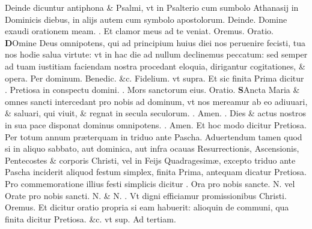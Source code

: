 \documentclass[a5paper,10pt]{book}
\makeatletter
\DeclareRobustCommand{\Vbar}{\vers@resp{-0.1em}{V}}
\DeclareRobustCommand{\Rbar}{\vers@resp{0pt}{R}}
\newcommand{\vers@resp@sym}{\raisebox{0.2ex}{\rotatebox[origin=c]{-20}{$\m@th\rceil$}}}
\newcommand{\vers@resp}[2]{%
  {\ooalign{\hidewidth\kern#1\vers@resp@sym\hidewidth\cr#2\cr}}%
}%
\def\ae{æ}
\makeatother
\begin{document}
\begin{multicols*}{2}
\newline {} \color{red} Deinde dicuntur %
antiphona \& Psalmi, vt in Psalterio cum sumbolo Athanasij in Dominicis diebus, in alijs autem cum symbolo apostolorum. Deinde. \color{black} Domine exaudi orationem meam. \color{red} \Rbar . \color{black} Et clamor meus ad te veniat. \color{red} O\color{black}remus. \color{red} Oratio. \color{black}
\vspace{-.25em}
\lettrine[lines=2]{\bfseries \color{red} D}{}Omine Deus omnipotens, qui ad principium huius diei nos peruenire fecisti, tua nos hodie salua virtute: vt in hac die ad nullum declinemus peccatum: sed semper ad tuam iustitiam faciendam nostra procedant eloquia, dirigantur cogitationes, \& opera. Per dominum. Benedic. \color{red} \&c. \color{black} Fidelium. \color{red} vt supra.
Et sic finita Prima dicitur \Vbar . \color{black} Pretiosa in conspectu domini. \color{red} \Rbar . \color{black} Mors sanctorum eius. \color{red} Oratio. \color{black}
\vspace{-1.25em}
\lettrine[lines=2]{\bfseries \color{red} S}{}Ancta Maria \& omnes sancti intercedant pro nobis ad dominum, vt nos mereamur ab eo adiuuari, \& saluari, qui viuit, \& regnat in secula seculorum. \color{red} \Rbar . \color{black} Amen. \color{red} \Vbar . \color{black} Dies \& actus nostros in sua pace disponat dominus omnipotens. \color{red} \Rbar . \color{black} Amen.
\color{red} Et hoc modo dicitur \color{black} Pretiosa. \color{red} Per totum annum pr\ae terquam in triduo ante Pascha. \color{black}
\newline {} \color{red} Aduertendum tamen quod si in aliquo sabbato, aut dominica, aut infra ocauas Resurrectionis, Ascensionis, Pentecostes \& corporis Christi, vel in Feijs Quadragesim\ae , excepto triduo ante Pascha inciderit aliquod festum simplex, finita Prima, antequam dicatur \color{black} Pretiosa. \color{red} Pro commemoratione illius festi simplicis dicitur \Vbar . \color{black} Ora pro nobis sancte. \color{red} N. vel \color{black} Orate pro nobis sancti. \color{red} N. \& N. \Rbar . \color{black} Vt digni efficiamur promissionibus Christi. \color{red} O\color{black}remus. \color{red} Et dicitur oratio propria si eam habuerit: alioquin de communi, qua finita dicitur \color{black} Pretiosa. \color{red} \&c. vt sup. \color{black}
\newline {} \color{red} Ad \hypertarget{DOM-PRIMA-ADV-TER}{tertiam.} \color{black}
\vspace{-.25em}

\end{multicols*}
\end{document}
